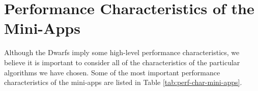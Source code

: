 \documentclass[runningheads,a4paper]{llncs}
\begin{document}
%
%
%
%


\section{Performance Characteristics of the Mini-Apps}

Although the Dwarfs imply some high-level performance characteristics, we believe it is important to consider all of the characteristics of the particular algorithms we have chosen. Some of the most important performance characteristics of the mini-apps are listed in Table \ref{tab:perf-char-mini-apps}.
\end{document}
